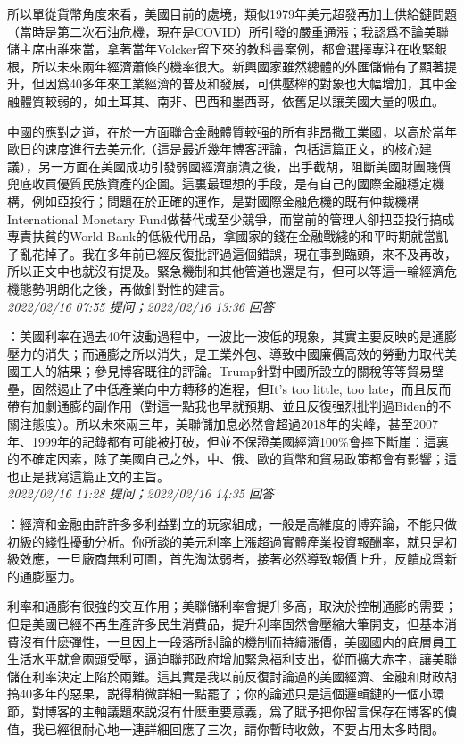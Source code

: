 \documentclass[twocolumn]{ctexart}
\begin{document}
所以單從貨幣角度來看，美國目前的處境，類似1979年美元超發再加上供給鏈問題（當時是第二次石油危機，現在是COVID）所引發的嚴重通漲；我認爲不論美聯儲主席由誰來當，拿著當年Volcker留下來的教科書案例，都會選擇專注在收緊銀根，所以未來兩年經濟蕭條的機率很大。新興國家雖然總體的外匯儲備有了顯著提升，但因爲40多年來工業經濟的普及和發展，可供壓榨的對象也大幅增加，其中金融體質較弱的，如土耳其、南非、巴西和墨西哥，依舊足以讓美國大量的吸血。

中國的應對之道，在於一方面聯合金融體質較强的所有非昂撒工業國，以高於當年歐日的速度進行去美元化（這是最近幾年博客評論，包括這篇正文，的核心建議），另一方面在美國成功引發弱國經濟崩潰之後，出手截胡，阻斷美國財團賤價兜底收買優質民族資產的企圖。這裏最理想的手段，是有自己的國際金融穩定機構，例如亞投行；問題在於正確的運作，是對國際金融危機的既有仲裁機構International Monetary Fund做替代或至少競爭，而當前的管理人卻把亞投行搞成專責扶貧的World Bank的低級代用品，拿國家的錢在金融戰綫的和平時期就當凱子亂花掉了。我在多年前已經反復批評過這個錯誤，現在事到臨頭，來不及再改，所以正文中也就沒有提及。緊急機制和其他管道也還是有，但可以等這一輪經濟危機態勢明朗化之後，再做針對性的建言。
\\

\textit{\hfill\noindent\small 2022/02/16 07:55 提问；2022/02/16 13:36 回答}

：美國利率在過去40年波動過程中，一波比一波低的現象，其實主要反映的是通膨壓力的消失；而通膨之所以消失，是工業外包、導致中國廉價高效的勞動力取代美國工人的結果；參見博客既往的評論。Trump針對中國所設立的關稅等等貿易壁壘，固然遏止了中低產業向中方轉移的進程，但It's too little, too late，而且反而帶有加劇通膨的副作用（對這一點我也早就預期、並且反復强烈批判過Biden的不關注態度）。所以未來兩三年，美聯儲加息必然會超過2018年的尖峰，甚至2007年、1999年的記錄都有可能被打破，但並不保證美國經濟100\%會摔下斷崖：這裏的不確定因素，除了美國自己之外，中、俄、歐的貨幣和貿易政策都會有影響；這也正是我寫這篇正文的主旨。
\\

\textit{\hfill\noindent\small 2022/02/16 11:28 提问；2022/02/16 14:35 回答}

：經濟和金融由許許多多利益對立的玩家組成，一般是高維度的博弈論，不能只做初級的綫性擾動分析。你所談的美元利率上漲超過實體產業投資報酬率，就只是初級效應，一旦廠商無利可圖，首先淘汰弱者，接著必然導致報價上升，反饋成爲新的通膨壓力。

利率和通膨有很強的交互作用；美聯儲利率會提升多高，取決於控制通膨的需要；但是美國已經不再生產許多民生消費品，提升利率固然會壓縮大筆開支，但基本消費沒有什麽彈性，一旦因上一段落所討論的機制而持續漲價，美國國内的底層員工生活水平就會兩頭受壓，逼迫聯邦政府增加緊急福利支出，從而擴大赤字，讓美聯儲在利率決定上陷於兩難。這其實是我以前反復討論過的美國經濟、金融和財政胡搞40多年的惡果，説得稍微詳細一點罷了；你的論述只是這個邏輯鏈的一個小環節，對博客的主軸議題來説沒有什麽重要意義，爲了賦予把你留言保存在博客的價值，我已經很耐心地一連詳細回應了三次，請你暫時收斂，不要占用太多時間。
\end{document}
